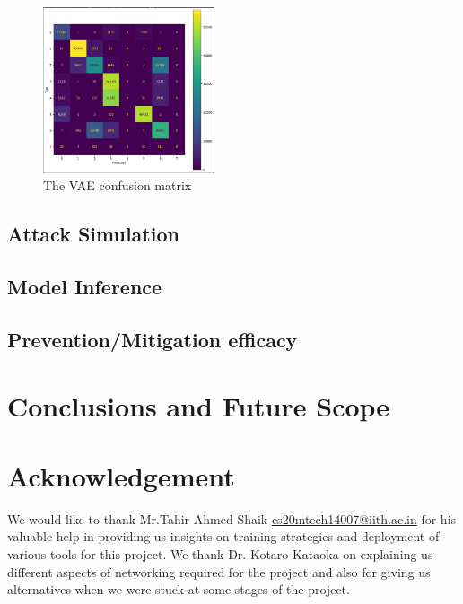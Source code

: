 \documentclass[10pt,twocolumn,letterpaper]{article}
\begin{document}
\begin{figure}[h]
    \includegraphics[width = 0.45\textwidth]{src/img/results/vae_cm.jpg}
    \caption{The VAE confusion matrix}
    \label{fig:incep}
\end{figure}

\subsection{Attack Simulation} %

\subsection{Model Inference}
 
 
\subsection{Prevention/Mitigation efficacy}


\section{Conclusions and Future Scope}

\section{Acknowledgement} %
We would like to thank Mr.Tahir Ahmed Shaik\cite{capsaeul} \href{mailto:cs20mtech14007@iith.ac.in}{cs20mtech14007@iith.ac.in} for his valuable help in providing us insights on training strategies and deployment of various tools for this project. We thank Dr. Kotaro Kataoka on explaining us different aspects of networking required for the project and also for giving us alternatives when we were stuck at some stages of the project.  



{\small


}
\end{document}
